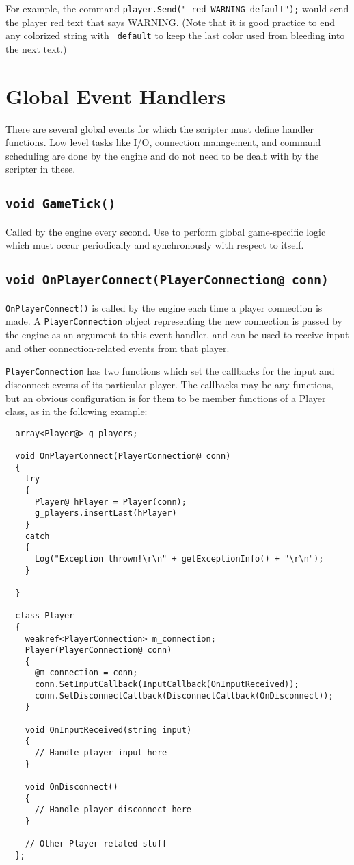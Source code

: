 \documentclass{book}
\begin{document}
For example, the command \texttt{player.Send(" red WARNING
  default");} would send the player red text that says WARNING. (Note that
it is good practice to end any colorized string with \texttt{
  default} to keep the last color used from bleeding into the next text.)


\section{Global Event Handlers}

There are several global events for which the scripter must define handler
functions. Low level tasks like I/O, connection management, and command
scheduling are done by the engine and do not need to be dealt with by the
scripter in these.

\subsection{\texttt{void GameTick()}}
Called by the engine every second. Use to perform global game-specific logic
which must occur periodically and synchronously with respect to itself.

\subsection{\texttt{void OnPlayerConnect(PlayerConnection@ conn)}}
\texttt{OnPlayerConnect()} is called by the engine each time a player connection
is made. A \texttt{PlayerConnection} object representing the new connection is
passed by the engine as an argument to this event handler, and can be used to
receive input and other connection-related events from that player.

\texttt{PlayerConnection} has two functions which set the callbacks for the
input and disconnect events of its particular player. The callbacks may be any
functions, but an obvious configuration is for them to be member functions
of a Player class, as in the following example:

\begin{lstlisting}
  array<Player@> g_players;

  void OnPlayerConnect(PlayerConnection@ conn)
  {
    try
    {
      Player@ hPlayer = Player(conn);
      g_players.insertLast(hPlayer)
    }
    catch
    {
      Log("Exception thrown!\r\n" + getExceptionInfo() + "\r\n");
    }

  }

  class Player
  {
    weakref<PlayerConnection> m_connection;
    Player(PlayerConnection@ conn)
    {
      @m_connection = conn;
      conn.SetInputCallback(InputCallback(OnInputReceived));
      conn.SetDisconnectCallback(DisconnectCallback(OnDisconnect));
    }

    void OnInputReceived(string input)
    {
      // Handle player input here
    }

    void OnDisconnect()
    {
      // Handle player disconnect here
    }

    // Other Player related stuff
  };

\end{lstlisting}
\end{document}
